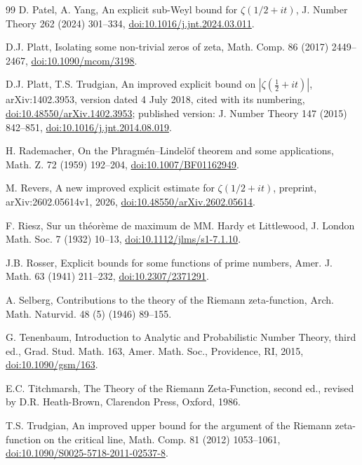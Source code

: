 \documentclass[11pt,a4paper]{article}
\numberwithin{equation}{section}
\theoremstyle{definition}
\theoremstyle{remark}
\begin{document}
\begin{thebibliography}{99}
 D. Patel, A. Yang, An explicit sub-Weyl bound for $\zeta(1/2+it)$, J. Number Theory 262 (2024) 301--334, \href{https://doi.org/10.1016/j.jnt.2024.03.011}{doi:10.1016/j.jnt.2024.03.011}.

 D.J. Platt, Isolating some non-trivial zeros of zeta, Math. Comp. 86 (2017) 2449--2467, \href{https://doi.org/10.1090/mcom/3198}{doi:10.1090/mcom/3198}.

 D.J. Platt, T.S. Trudgian, An improved explicit bound on $|\zeta(\frac12+it)|$, arXiv:1402.3953, version dated 4 July 2018, cited with its numbering, \href{https://doi.org/10.48550/arXiv.1402.3953}{doi:10.48550/arXiv.1402.3953}; published version: J. Number Theory 147 (2015) 842--851, \href{https://doi.org/10.1016/j.jnt.2014.08.019}{doi:10.1016/j.jnt.2014.08.019}.

 H. Rademacher, On the Phragm\'en--Lindel\"of theorem and some applications, Math. Z. 72 (1959) 192--204, \href{https://doi.org/10.1007/BF01162949}{doi:10.1007/BF01162949}.

 M. Revers, A new improved explicit estimate for $\zeta(1/2+it)$, preprint, arXiv:2602.05614v1, 2026, \href{https://doi.org/10.48550/arXiv.2602.05614}{doi:10.48550/arXiv.2602.05614}.

 F. Riesz, Sur un th\'eor\`eme de maximum de MM. Hardy et Littlewood, J. London Math. Soc. 7 (1932) 10--13, \href{https://doi.org/10.1112/jlms/s1-7.1.10}{doi:10.1112/jlms/s1-7.1.10}.

 J.B. Rosser, Explicit bounds for some functions of prime numbers, Amer. J. Math. 63 (1941) 211--232, \href{https://doi.org/10.2307/2371291}{doi:10.2307/2371291}.

 A. Selberg, Contributions to the theory of the Riemann zeta-function, Arch. Math. Naturvid. 48 (5) (1946) 89--155.

 G. Tenenbaum, Introduction to Analytic and Probabilistic Number Theory, third ed., Grad. Stud. Math. 163, Amer. Math. Soc., Providence, RI, 2015, \href{https://doi.org/10.1090/gsm/163}{doi:10.1090/gsm/163}.

 E.C. Titchmarsh, The Theory of the Riemann Zeta-Function, second ed., revised by D.R. Heath-Brown, Clarendon Press, Oxford, 1986.

 T.S. Trudgian, An improved upper bound for the argument of the Riemann zeta-function on the critical line, Math. Comp. 81 (2012) 1053--1061, \href{https://doi.org/10.1090/S0025-5718-2011-02537-8}{doi:10.1090/S0025-5718-2011-02537-8}.


\end{thebibliography}
\end{document}
